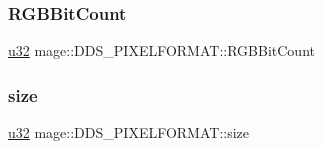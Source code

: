\subsubsection{\texorpdfstring{R\+G\+B\+Bit\+Count}{RGBBitCount}}
{\footnotesize\ttfamily \hyperlink{namespacemage_af2b398bf98eb10351f49cad73fe2cc73}{u32} mage\+::\+D\+D\+S\+\_\+\+P\+I\+X\+E\+L\+F\+O\+R\+M\+A\+T\+::\+R\+G\+B\+Bit\+Count}

\hypertarget{structmage_1_1_d_d_s___p_i_x_e_l_f_o_r_m_a_t_aa990284649b37b8eb6c7f927ee188ec6}{}\label{structmage_1_1_d_d_s___p_i_x_e_l_f_o_r_m_a_t_aa990284649b37b8eb6c7f927ee188ec6} 
\subsubsection{\texorpdfstring{size}{size}}
{\footnotesize\ttfamily \hyperlink{namespacemage_af2b398bf98eb10351f49cad73fe2cc73}{u32} mage\+::\+D\+D\+S\+\_\+\+P\+I\+X\+E\+L\+F\+O\+R\+M\+A\+T\+::size}

